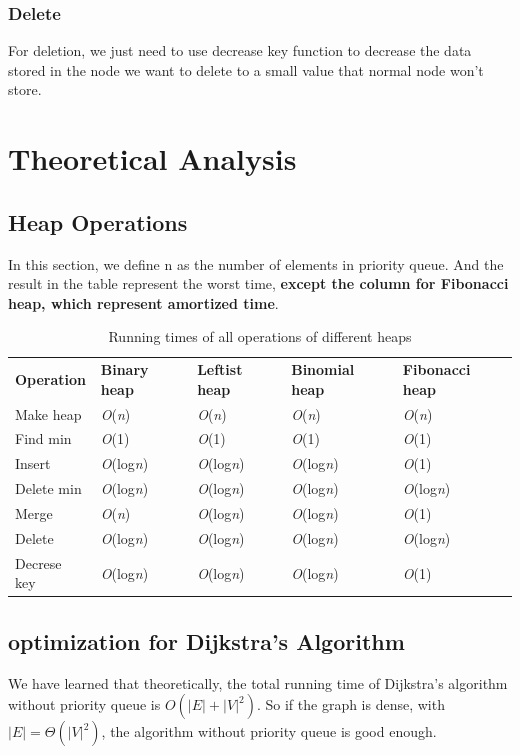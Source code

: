 \documentclass[12pt]{article}
\begin{document}
    \subsubsection{Delete}
    For deletion, we just need to use decrease key function to decrease
    the data stored in the node we want to delete to a small value that 
    normal node won't store. 

    \section{Theoretical Analysis}
    \subsection{Heap Operations}
    In this section, we define n as the number of elements in 
    priority queue. And the result in the table represent the 
    worst time, \textbf{except the column for Fibonacci heap, which
    represent amortized time}. 
    \begin{table}[h]
        \centering
		\begin{tabular}{l l l l l}
			
			\textbf{Operation} & \textbf{Binary heap} & \textbf{Leftist heap} & \textbf{Binomial heap} & \textbf{Fibonacci heap}\\
			
			Make heap    & \emph{O}(\emph{n}) & \emph{O}(\emph{n}) & \emph{O}(\emph{n}) & \emph{O}(\emph{n})\\
			Find min     & \emph{O}(1)        & \emph{O}(1)        & \emph{O}(1)        & \emph{O}(1)\\
			Insert       & \emph{O}(log\emph{n}) & \emph{O}(log\emph{n}) & \emph{O}(log\emph{n}) & \emph{O}(1)\\
            Delete min   & \emph{O}(log\emph{n}) & \emph{O}(log\emph{n}) & \emph{O}(log\emph{n}) & \emph{O}(log\emph{n})\\
            Merge        & \emph{O}(\emph{n}) & \emph{O}(log\emph{n}) & \emph{O}(log\emph{n}) & \emph{O}(1)\\
            Delete       & \emph{O}(log\emph{n}) & \emph{O}(log\emph{n}) & \emph{O}(log\emph{n}) & \emph{O}(log\emph{n})\\
            Decrese key  & \emph{O}(log\emph{n}) & \emph{O}(log\emph{n}) & \emph{O}(log\emph{n}) & \emph{O}(1)
		\end{tabular}
		\caption{Running times of all operations of different heaps}
	\end{table}
    \subsection{optimization for Dijkstra's Algorithm}
    We have learned that theoretically, the total running time of 
    Dijkstra's algorithm without priority queue is $O(|E|+|V|^{2})$. 
    So if the graph is dense, with $|E| = \Theta(|V|^{2})$, the algorithm 
    without priority queue is good enough.
\end{document}
